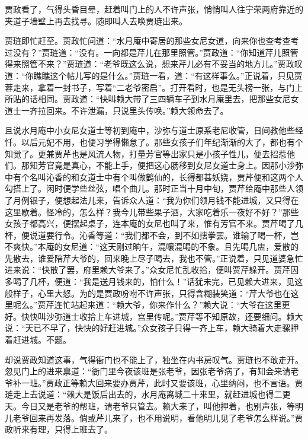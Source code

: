 \begin{parag}
    贾政看了，气得头昏目晕，赶着叫门上的人不许声张，悄悄叫人往宁荣两府靠近的夹道子墙壁上再去找寻。随即叫人去唤贾琏出来。
\end{parag}


\begin{parag}
    贾琏即忙赶至。贾政忙问道：“水月庵中寄居的那些女尼女道，向来你也查考查考过没有？”贾琏道：“没有。一向都是芹儿在那里照管。”贾政道：“你知道芹儿照管得来照管不来？”贾琏道：“老爷既这么说，想来芹儿必有不妥当的地方儿。”贾政叹道：“你瞧瞧这个帖儿写的是什么。”贾琏一看，道：“有这样事么。”正说着，只见贾蓉走来，拿着一封书子，写着“二老爷密启”。打开看时，也是无头榜一张，与门上所贴的话相同。贾政道：“快叫赖大带了三四辆车子到水月庵里去，把那些女尼女道士一齐拉回来。不许泄漏，只说里头传唤。”赖大领命去了。
\end{parag}


\begin{parag}
    且说水月庵中小女尼女道士等初到庵中，沙弥与道士原系老尼收管，日间教他些经忏。以后元妃不用，也便习学得懒怠了。那些女孩子们年纪渐渐的大了，都也有个知觉了。更兼贾芹也是风流人物，打量芳官等出家只是小孩子性儿，便去招惹他们。那知芳官竟是真心，不能上手，便把这心肠移到女尼女道士身上。因那小沙弥中有个名叫沁香的和女道士中有个叫做鹤仙的，长得都甚妖娆，贾芹便和这两个人勾搭上了。闲时便学些丝弦，唱个曲儿。那时正当十月中旬，贾芹给庵中那些人领了月例银子，便想起法儿来，告诉众人道：“我为你们领月钱不能进城，又只得在这里歇着。怪冷的，怎么样？我今儿带些果子酒，大家吃着乐一夜好不好？”那些女孩子都高兴，便摆起桌子，连本庵的女尼也叫了来，惟有芳官不来。贾芹喝了几杯，便说道要行令。沁香等道：“我们都不会，到不如搳拳罢。谁输了喝一杯，岂不爽快。”本庵的女尼道：“这天刚过晌午，混嚷混喝的不象。且先喝几盅，爱散的先散去，谁爱陪芹大爷的，回来晚上尽子喝去，我也不管。”正说着，只见道婆急忙进来说：“快散了罢，府里赖大爷来了。”众女尼忙乱收拾，便叫贾芹躲开。贾芹因多喝了几杯，便道：“我是送月钱来的，怕什么！”话犹未完，已见赖大进来，见这般样子，心里大怒。为的是贾政吩咐不许声张，只得含糊装笑道：“芹大爷也在这里呢么。”贾芹连忙站起来道：“赖大爷，你来作什么？”赖大说：“大爷在这里更好。快快叫沙弥道士收拾上车进城，宫里传呢。”贾芹等不知原故，还要细问。赖大说：“天已不早了，快快的好赶进城。”众女孩子只得一齐上车，赖大骑着大走骡押着赶进城。不题。
\end{parag}


\begin{parag}
    却说贾政知道这事，气得衙门也不能上了，独坐在内书房叹气。贾琏也不敢走开。忽见门上的进来禀道：“衙门里今夜该班是张老爷，因张老爷病了，有知会来请老爷补一班。”贾政正等赖大回来要办贾芹，此时又要该班，心里纳闷，也不言语。贾琏走上去说道：“赖大是饭后出去的，水月庵离城二十来里，就赶进城也得二更天。今日又是老爷的帮班，请老爷只管去。赖大来了，叫他押着，也别声张，等明儿老爷回来再发落。倘或芹儿来了，也不用说明，看他明儿见了老爷怎么样说。”贾政听来有理，只得上班去了。
\end{parag}


